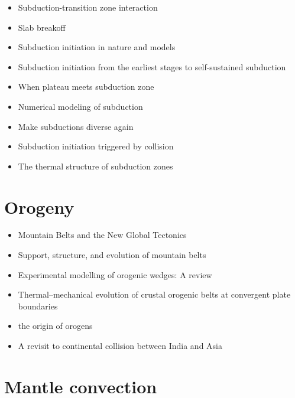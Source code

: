 \begin{itemize}
   \item [\twothousandseventeen] Subduction-transition zone interaction \cite{goav17}
   \item [\twothousandeighteen] Slab breakoff \cite{garm18}
   \item [\twothousandeighteen] Subduction initiation in nature and models \cite{stge18}
   \item [\twothousandtwentyone] Subduction initiation from the earliest stages to self-sustained subduction \cite{laar21}
   \item [\twothousandtwentyone] When plateau meets subduction zone \cite{lidl21}
   \item [\twothousandtwentytwo] Numerical modeling of subduction \cite{gery22}
   \item [\twothousandtwentytwo] Make subductions diverse again \cite{chmm22}
   \item [\twothousandtwentytwo] Subduction initiation triggered by collision \cite{yang22} 
   \item [\twothousandtwentythree] The thermal structure of subduction zones \cite{vawi23,wiva23,vawi23b}
   \end{itemize}

\section{Orogeny}
   \begin{itemize}
   \item [\nineteenseventy] Mountain Belts and the New Global Tectonics  \cite{debi70}
   \item [\nineteeneightyeight] Support, structure, and evolution of mountain belts \cite{moly88}
   \item [\twothousandtwelve] Experimental modelling of orogenic wedges: A review \cite{grmd12} 
   \item [\twothousandtwelve] Thermal–mechanical evolution of crustal orogenic belts at convergent plate boundaries \cite{vand12}
   \item [\twothousandthirteen] the origin of orogens \cite{jabe13}
   \item [2025] A revisit to continental collision between India and Asia \cite{zhen25}
   \end{itemize}

\section{Mantle convection}


